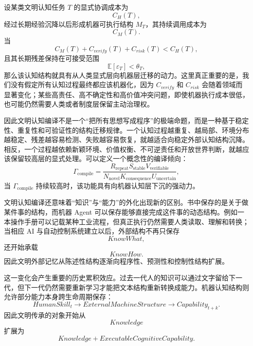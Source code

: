 设某类文明认知任务 $T$ 的显式协调成本为
\begin{equation}
C_H(T),
\end{equation}
经过长期经验沉降以后形成机器可执行结构 $M_T$，其持续调用成本为
\begin{equation}
C_M(T).
\end{equation}
当
\begin{equation}
C_M(T)
+
C_{verify}(T)
+
C_{risk}(T)
<
C_H(T),
\end{equation}
且其长期残差保持在可接受范围
\begin{equation}
\mathbb{E}
[
\varepsilon_T
]
<
\theta_T,
\end{equation}
那么该认知结构就具有从人类显式层向机器层迁移的动力。这里真正重要的是，我们没有假定所有认知过程最终都应该机器化，因为 $C_{verify}$ 和 $C_{risk}$ 会随着领域而显著变化；某些高责任、高不确定性和高价值冲突问题，即使机器执行成本很低，也可能仍然需要人类或者制度层保留主动治理权。

因此文明认知编译不是一个“把所有思想写成程序”的极端命题，而是一种基于稳定性、重复性和可验证性的结构迁移规律。一个认知过程越重复、越局部、环境分布越稳定、残差越容易检测、失败越容易恢复，就越适合向稳定外部认知结构沉降。相反，一个过程越依赖新颖环境、价值权衡、不可逆责任和开放世界判断，就越应该保留较高层的显式处理。可以定义一个概念性的编译倾向：
\begin{equation}
\Gamma_{\mathrm{compile}}
=
\frac{
R_{\mathrm{repeat}}
S_{\mathrm{stable}}
V_{\mathrm{verifiable}}
}{
N_{\mathrm{novel}}
K_{\mathrm{consequence}}
U_{\mathrm{uncertain}}
},
\end{equation}
当 $\Gamma_{\mathrm{compile}}$ 持续较高时，该功能具有向机器认知层下沉的强动力。

文明认知编译还意味着“知识”与“能力”的外化出现新的区别。书中保存的是关于做某件事的结构，而机器 Agent 可以保存能够直接完成这件事的动态结构。例如一本操作手册可以记载某种工业流程，但真正执行仍然需要人类读取、理解和转换；当相应 AI 与自动控制系统建立以后，外部结构不再只保存
\begin{equation}
KnowWhat,
\end{equation}
还开始承载
\begin{equation}
KnowHow.
\end{equation}
因此文明外部记忆从陈述性结构逐渐向程序性、预测性和控制性结构扩展。

这一变化会产生重要的历史累积效应。过去一代人的知识可以通过文字留给下一代，但下一代仍然需要重新学习才能把文本结构重新转换成能力。机器认知结构则允许部分能力本身跨生命周期保存：
\begin{equation}
HumanSkill_t
\rightarrow
ExternalMachineStructure
\rightarrow
Capability_{t+k}.
\end{equation}
因此文明传承的对象开始从
\begin{equation}
Knowledge
\end{equation}
扩展为
\begin{equation}
Knowledge+ExecutableCognitiveCapability.
\end{equation}


